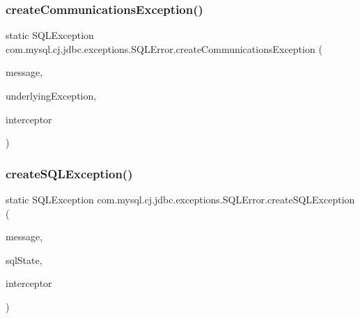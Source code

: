 \subsubsection{\texorpdfstring{create\+Communications\+Exception()}{createCommunicationsException()}\hspace{0.1cm}{\footnotesize\ttfamily [2/2]}}
{\footnotesize\ttfamily static S\+Q\+L\+Exception com.\+mysql.\+cj.\+jdbc.\+exceptions.\+S\+Q\+L\+Error.\+create\+Communications\+Exception (\begin{DoxyParamCaption}\item[{String}]{message,  }\item[{Throwable}]{underlying\+Exception,  }\item[{\mbox{\hyperlink{interfacecom_1_1mysql_1_1cj_1_1exceptions_1_1_exception_interceptor}{Exception\+Interceptor}}}]{interceptor }\end{DoxyParamCaption})\hspace{0.3cm}{\ttfamily [static]}}

\mbox{\label{classcom_1_1mysql_1_1cj_1_1jdbc_1_1exceptions_1_1_s_q_l_error_a4a4abbc46fa81c8180b80d304d6b8cd7}} 
\subsubsection{\texorpdfstring{create\+S\+Q\+L\+Exception()}{createSQLException()}\hspace{0.1cm}{\footnotesize\ttfamily [1/7]}}
{\footnotesize\ttfamily static S\+Q\+L\+Exception com.\+mysql.\+cj.\+jdbc.\+exceptions.\+S\+Q\+L\+Error.\+create\+S\+Q\+L\+Exception (\begin{DoxyParamCaption}\item[{String}]{message,  }\item[{String}]{sql\+State,  }\item[{\mbox{\hyperlink{interfacecom_1_1mysql_1_1cj_1_1exceptions_1_1_exception_interceptor}{Exception\+Interceptor}}}]{interceptor }\end{DoxyParamCaption})\hspace{0.3cm}{\ttfamily [static]}}

